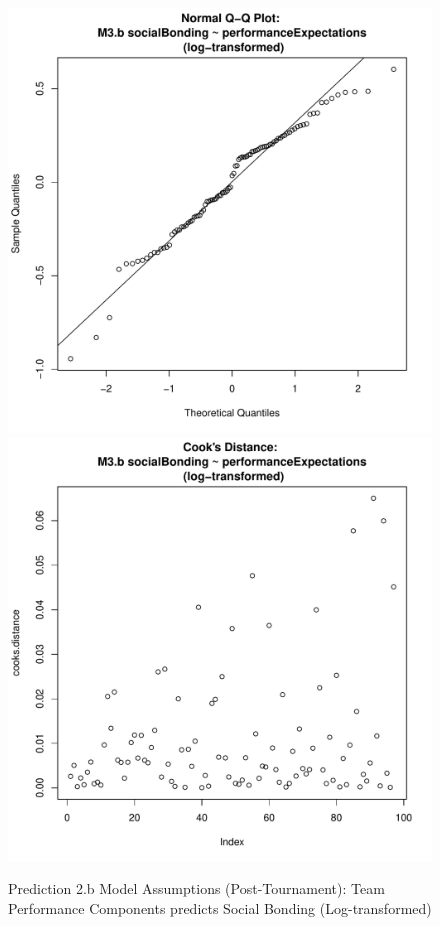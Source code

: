 \begin{CJK}{UTF8}{gbsn}
\begin{figure}[!htbp]
        \includegraphics[scale =.4]{images/MLM3bLogQQNorm.pdf}
        \includegraphics[scale =.4]{images/MLM3bLogCooksD.pdf}
        \caption{Prediction 2.b Model Assumptions (Post-Tournament): Team Performance Components predicts Social Bonding (Log-transformed)}
        \label{fig:MLM3bLogAssumptions}
      \end{figure}




\end{CJK}
